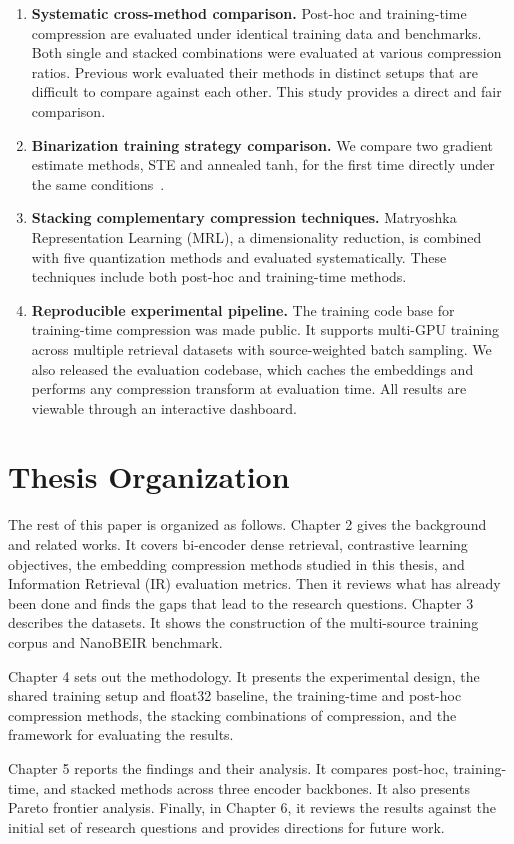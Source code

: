 \begin{enumerate}

    \item \textbf{Systematic cross-method comparison.}
    Post-hoc and training-time compression are evaluated under identical training data and benchmarks.  Both single and stacked combinations were evaluated at various compression ratios. Previous work evaluated their methods in distinct setups that are difficult to compare against each other. This study provides a direct and fair comparison.

    \item \textbf{Binarization training strategy comparison.}
    We compare two gradient estimate methods, STE and annealed tanh, for the first time directly under the same conditions~\cite{bengio2013estimating, yamada2021efficient}.

    \item \textbf{Stacking complementary compression techniques.}
    Matryoshka Representation Learning (MRL), a dimensionality reduction, is combined with five quantization methods and evaluated systematically. These techniques include both post-hoc and training-time methods.

    \item \textbf{Reproducible experimental pipeline.}
    The training code base for training-time compression was made public. It supports multi-GPU training across multiple retrieval datasets with source-weighted batch sampling. We also released the evaluation codebase, which caches the embeddings and performs any compression transform at evaluation time. All results are viewable through an interactive dashboard.

\end{enumerate}

\section{Thesis Organization}

The rest of this paper is organized as follows. Chapter 2 gives the background and related works. It covers bi-encoder dense retrieval, contrastive learning objectives, the embedding compression methods studied in this thesis, and Information Retrieval (IR) evaluation metrics. Then it reviews what has already been done and finds the gaps that lead to the research questions. Chapter 3 describes the datasets. It shows the construction of the multi-source training corpus and NanoBEIR benchmark.

Chapter 4 sets out the methodology. It presents the experimental design, the shared training setup and float32 baseline, the training-time and post-hoc compression methods, the stacking combinations of compression, and the framework for evaluating the results.

Chapter 5 reports the findings and their analysis. It compares post-hoc, training-time, and stacked methods across three encoder backbones. It also presents Pareto frontier analysis. Finally, in Chapter 6, it reviews the results against the initial set of research questions and provides directions for future work.
